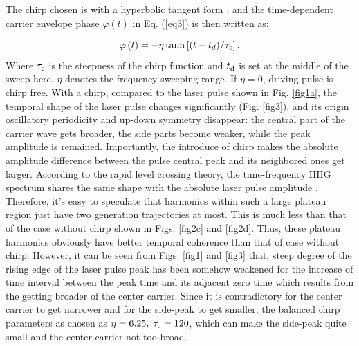 \documentclass[10pt,letterpaper]{article}
\begin{document}
The chirp chosen is with a hyperbolic tangent form \cite{Carrera-Chirp-PRA-2007}, and the time-dependent carrier envelope phase $ \varphi(t) $ in Eq. (\ref{eq3}) is then written as:

\begin{equation}
\varphi \left( t \right) =  - \eta \tanh \left[ {{{\left( {t - {t_d}} \right)} \mathord{\left/
			{\vphantom {{\left( {t - {t_d}} \right)} {{\tau _c}}}} \right.
			\kern-\nulldelimiterspace} {{\tau _c}}}} \right].
\label{eq17}
\end{equation}
Where $ \tau_{\rm{c}} $ is the steepness of the chirp function and $ t_{\rm{d}} $ is set at the middle of the sweep here. $ \eta $  denotes the frequency sweeping range. If $ \eta=0 $, driving pulse is chirp free. With a chirp, compared to the laser pulse shown in Fig. \ref{fig1a}, the temporal shape of the laser pulse changes significantly (Fig. \ref{fig3}), and its origin oscillatory periodicity and up-down symmetry disappear: the central part of the carrier wave gets broader, the side parts become weaker, while the peak amplitude is remained. Importantly, the introduce of chirp makes the absolute amplitude difference between the pulse central peak and its neighbored ones get larger. According to the rapid level crossing theory, the time-frequency HHG spectrum shares the same shape with the absolute laser pulse amplitude \cite{CuiNi2010NJP-wavelet}. Therefore, it's easy to speculate that harmonics within such a large plateau region just have two generation trajectories at most. This is much less than that of the case without chirp shown in Figs. \ref{fig2c} and \ref{fig2d}. Thus, these plateau harmonics obviously have better temporal coherence than that of case without chirp. However, it can be seen from Figs. \ref{fig1} and \ref{fig3} that, steep degree of the rising edge of the laser pulse peak has been
somehow weakened for the increase of time interval between the peak time and its adjacent zero time which results from the getting broader of the center carrier. Since it is contradictory for the center carrier to get narrower and for the side-peak to get smaller, the balanced chirp parameters as chosen as $\eta=6.25,\;\tau_{\rm{c}}=120$, which can make the side-peak quite small and the center carrier not too broad.
\end{document}
